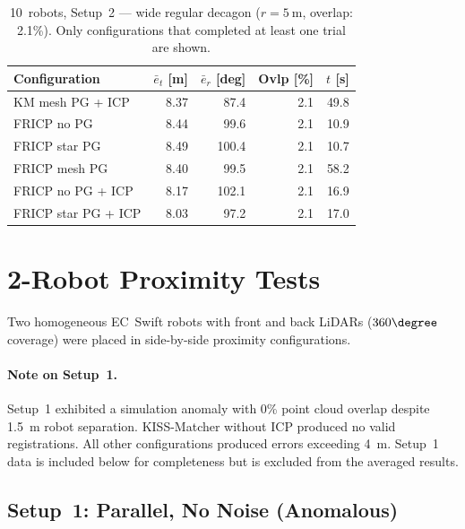 \begin{table}[htbp]
    \centering
    \caption{10~robots, Setup~2 --- wide regular decagon
             ($r = \SI{5}{\metre}$, overlap: 2.1\%).
             Only configurations that completed at least one
             trial are shown.}
    \label{tab:app_10r_s2}
    \small
    \begin{tabular}{l r r r r}
        \toprule
        \textbf{Configuration}
            & $\bar{e}_t$ [m]
            & $\bar{e}_r$ [deg]
            & Ovlp [\%]
            & $t$ [s] \\
        \midrule
        KM mesh PG + ICP    & 8.37 &  87.4 & 2.1 & 49.8 \\
        \midrule
        FRICP no PG         & 8.44 &  99.6 & 2.1 & 10.9 \\
        FRICP star PG       & 8.49 & 100.4 & 2.1 & 10.7 \\
        FRICP mesh PG       & 8.40 &  99.5 & 2.1 & 58.2 \\
        FRICP no PG + ICP   & 8.17 & 102.1 & 2.1 & 16.9 \\
        FRICP star PG + ICP & 8.03 &  97.2 & 2.1 & 17.0 \\
        \bottomrule
    \end{tabular}
\end{table}

\section{2-Robot Proximity Tests}
\label{sec:app_2robots}

Two homogeneous EC~Swift robots with front and back LiDARs
($360\degree$ coverage) were placed in side-by-side proximity
configurations.

\paragraph{Note on Setup~1.}
Setup~1 exhibited a simulation anomaly with 0\% point cloud
overlap despite \SI{1.5}{\metre} robot separation.
KISS-Matcher without ICP produced no valid registrations.
All other configurations produced errors exceeding \SI{4}{\metre}.
Setup~1 data is included below for completeness but is excluded
from the averaged results.

\subsection{Setup~1: Parallel, No Noise (Anomalous)}

